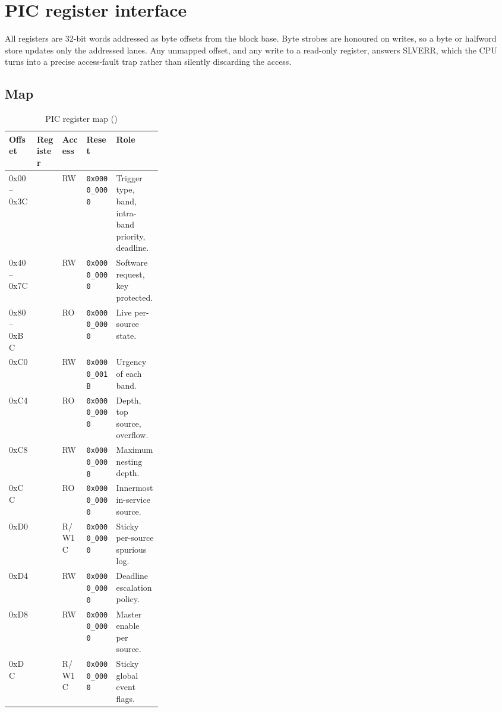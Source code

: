 \chapter{PIC register interface}
\label{ch:picregs}

All registers are 32-bit words addressed as byte offsets from the block base.
Byte strobes are honoured on writes, so a byte or halfword store updates only the
addressed lanes. Any unmapped offset, and any write to a read-only register,
answers SLVERR, which the CPU turns into a precise access-fault trap rather than
silently discarding the access.

\section{Map}

\begin{table}[H]
\centering
\caption{PIC register map ()}
\label{tab:picmap}
\begin{tabular}{@{}TlllL{0.30\linewidth}@{}}
\toprule
\textnormal{\textbf{Offset}} & \textbf{Register} & \textbf{Access} & \textbf{Reset} & \textbf{Role} \\
\midrule
0x00--0x3C &   & RW    & \texttt{0x0000\_0000} & Trigger type, band, intra-band priority, deadline. \\
0x40--0x7C &  & RW    & \texttt{0x0000\_0000} & Software request, key protected. \\
0x80--0xBC &    & RO    & \texttt{0x0000\_0000} & Live per-source state. \\
0xC0       &        & RW    & \texttt{0x0000\_001B} & Urgency of each band. \\
0xC4       &        & RO    & \texttt{0x0000\_0000} & Depth, top source, overflow. \\
0xC8       &           & RW    & \texttt{0x0000\_0008} & Maximum nesting depth. \\
0xCC       &         & RO    & \texttt{0x0000\_0000} & Innermost in-service source. \\
0xD0       &       & R/W1C & \texttt{0x0000\_0000} & Sticky per-source spurious log. \\
0xD4       &     & RW    & \texttt{0x0000\_0000} & Deadline escalation policy. \\
0xD8       &         & RW    & \texttt{0x0000\_0000} & Master enable per source. \\
0xDC       &         & R/W1C & \texttt{0x0000\_0000} & Sticky global event flags. \\
\bottomrule
\end{tabular}
\end{table}

